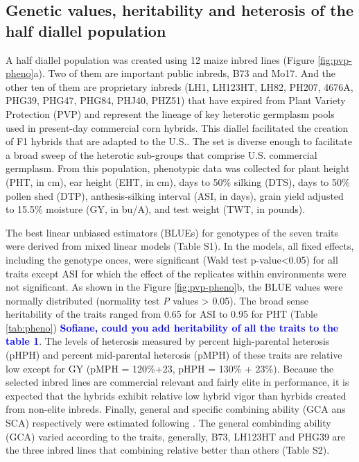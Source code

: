 \documentclass[9pt,twocolumn,twoside]{gsajnl}
\newcommand{\yang}[1]{\textcolor{blue}{\bf #1}}
\begin{document}
\subsection*{Genetic values, heritability and heterosis of the half diallel population}

A half diallel population was created using 12 maize inbred lines (Figure \ref{fig:pvp-pheno}a). Two of them are important public inbreds, B73 and Mo17. And the other ten of them are proprietary inbreds (LH1, LH123HT, LH82, PH207, 4676A, PHG39, PHG47, PHG84, PHJ40, PHZ51) that have expired from Plant Variety Protection (PVP) and represent the lineage of key heterotic germplasm pools used in present-day commercial corn hybrids. This diallel facilitated the creation of F1 hybrids that are adapted to the U.S.. The set is diverse enough to facilitate a broad sweep of the heterotic sub-groups that comprise U.S. commercial germplasm. From this population, phenotypic data was collected for plant height (PHT, in cm), ear height (EHT, in cm), days to 50\% silking (DTS), days to 50\% pollen shed (DTP), anthesis-silking interval (ASI, in days), grain yield adjusted to 15.5\% moisture (GY, in bu/A), and test weight (TWT, in pounds).

The best linear unbiased estimators (BLUEs) for genotypes of the seven traits were derived from mixed linear models (Table S1). In the models, all fixed effects, including the genotype onces, were significant (Wald test p-value<0.05) for all traits except ASI for which the effect of the replicates within environments were not significant. As shown in the Figure \ref{fig:pvp-pheno}b, the BLUE values were normally distributed (normality test \emph{P} values > 0.05). The broad sense heritability of the traits ranged from 0.65 for ASI to 0.95 for PHT (Table \ref{tab:pheno}) \yang{Sofiane, could you add heritability of all the traits to the table 1}. The levels of heterosis measured by percent high-parental heterosis (pHPH) and percent mid-parental heterosis (pMPH) of these traits are relative low except for GY (pMPH = 120\%+23, pHPH = 130\% + 23\%). Because the selected inbred lines are commercial relevant and fairly elite in performance, it is expected that the hybrids exhibit relative low hybrid vigor than hyrbids created from non-elite inbreds. Finally, general and specific combining ability (GCA ans SCA) respectively were estimated following \citep{Falconer1996}. The general combinding ability (GCA) varied according to the traits, generally, B73, LH123HT and PHG39 are the three inbred lines that combining relative better than others (Table S2).
\end{document}
